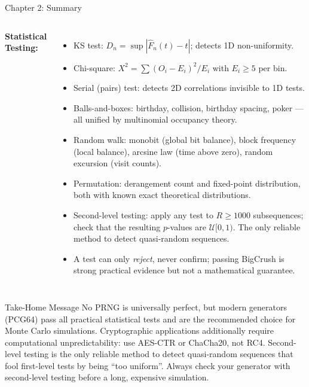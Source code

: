 \documentclass[aspectratio=169,10pt]{beamer}
\begin{document}
\begin{frame}{Chapter 2: Summary}
\begin{columns}
\textbf{Statistical Testing:}
\begin{itemize}
  \item KS test: $D_n = \sup|\hat{F}_n(t) - t|$; detects 1D non-uniformity.
  \item Chi-square: $X^2 = \sum(O_i-E_i)^2/E_i$ with $E_i \ge 5$ per bin.
  \item Serial (pairs) test: detects 2D correlations invisible to 1D tests.
  \item Balls-and-boxes: birthday, collision, birthday spacing, poker ---
    all unified by multinomial occupancy theory.
  \item Random walk: monobit (global bit balance), block frequency (local
    balance), arcsine law (time above zero), random excursion (visit counts).
  \item Permutation: derangement count and fixed-point distribution, both
    with known exact theoretical distributions.
  \item Second-level testing: apply any test to $R \ge 1000$ subsequences;
    check that the resulting $p$-values are $\mathcal{U}[0,1)$.  The only
    reliable method to detect quasi-random sequences.
  \item A test can only \emph{reject}, never confirm; passing BigCrush is
    strong practical evidence but not a mathematical guarantee.
\end{itemize}
\end{columns}

\medskip
\begin{alertblock}{Take-Home Message}
No PRNG is universally perfect, but modern generators (PCG64) pass all
practical statistical tests and are the recommended choice for Monte Carlo
simulations.  Cryptographic applications additionally require computational
unpredictability: use AES-CTR or ChaCha20, not RC4.  Second-level testing
is the only reliable method to detect quasi-random sequences that fool
first-level tests by being ``too uniform''.  Always check your generator
with second-level testing before a long, expensive simulation.
\end{alertblock}

\end{frame}
\end{document}
